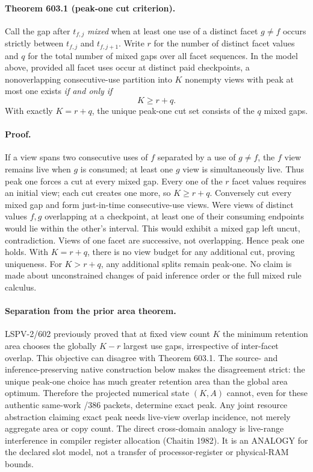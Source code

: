 \paragraph{Theorem 603.1 (peak-one cut criterion).}
Call the gap after $t_{f,j}$ \emph{mixed} when at least one use of a distinct facet $g\ne f$ occurs strictly between $t_{f,j}$ and $t_{f,j+1}$. Write $r$ for the number of distinct facet values and $q$ for the total number of mixed gaps over all facet sequences. In the model above, provided all facet uses occur at distinct paid checkpoints, a nonoverlapping consecutive-use partition into $K$ nonempty views with peak at most one exists \emph{if and only if}
\[
 \boxed{K\ge r+q.}
\]
With exactly $K=r+q$, the unique peak-one cut set consists of the $q$ mixed gaps.

\paragraph{Proof.}
If a view spans two consecutive uses of $f$ separated by a use of $g\ne f$, the $f$ view remains live when $g$ is consumed; at least one $g$ view is simultaneously live. Thus peak one forces a cut at every mixed gap. Every one of the $r$ facet values requires an initial view; each cut creates one more, so $K\ge r+q$. Conversely cut every mixed gap and form just-in-time consecutive-use views. Were views of distinct values $f,g$ overlapping at a checkpoint, at least one of their consuming endpoints would lie within the other's interval. This would exhibit a mixed gap left uncut, contradiction. Views of one facet are successive, not overlapping. Hence peak one holds. With $K=r+q$, there is no view budget for any additional cut, proving uniqueness. For $K>r+q$, any additional splits remain peak-one. No claim is made about unconstrained changes of paid inference order or the full mixed rule calculus.

\paragraph{Separation from the prior area theorem.}
LSPV-2/602 previously proved that at fixed view count $K$ the minimum retention area chooses the globally $K-r$ largest use gaps, irrespective of inter-facet overlap. This objective can disagree with Theorem 603.1. The source- and inference-preserving native construction below makes the disagreement strict: the unique peak-one choice has much greater retention area than the global area optimum. Therefore the projected numerical state $(K,A)$ cannot, even for these authentic same-work /386 packets, determine exact peak. Any joint resource abstraction claiming exact peak needs live-view overlap incidence, not merely aggregate area or copy count. The direct cross-domain analogy is live-range interference in compiler register allocation (Chaitin 1982). It is an ANALOGY for the declared slot model, not a transfer of processor-register or physical-RAM bounds.

